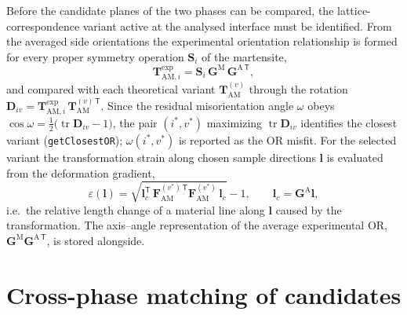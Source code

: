 \documentclass[11pt,a4paper]{article}
\newcommand{\mat}[1]{\mathbf{#1}}
\newcommand{\vc}[1]{\bm{#1}}
\newcommand{\trace}{\operatorname{tr}}
\begin{document}
Before the candidate planes of the two phases can be compared, the lattice-correspondence variant active at the analysed interface must be identified. From the averaged side orientations the experimental orientation relationship is formed for every proper symmetry operation $\mat S_i$ of the martensite,
\begin{equation}
\mat T^{\mathrm{exp}}_{\mathrm{AM},i}=\mat S_i\,\mat G^{\mathrm{M}}\,\mat G^{\mathrm{A}\,\mathsf T},
\label{eq:expOR}
\end{equation}
and compared with each theoretical variant $\mat T^{(v)}_{\mathrm{AM}}$ through the rotation $\mat D_{i v}=\mat T^{\mathrm{exp}}_{\mathrm{AM},i}\,\mat T^{(v)\,\mathsf T}_{\mathrm{AM}}$. Since the residual misorientation angle $\omega$ obeys $\cos\omega = \tfrac12\big(\trace \mat D_{iv}-1\big)$, the pair $(i^\ast,v^\ast)$ maximizing $\trace\mat D_{iv}$ identifies the closest variant (\texttt{getClosestOR}); $\omega(i^\ast,v^\ast)$ is reported as the OR misfit. For the selected variant the transformation strain along chosen sample directions $\vc l$ is evaluated from the deformation gradient,
\begin{equation}
\varepsilon(\vc l)=\sqrt{\vc l_{c}^{\mathsf T}\,\mat F^{(v^\ast)\,\mathsf T}_{\mathrm{AM}}\mat F^{(v^\ast)}_{\mathrm{AM}}\,\vc l_{c}}-1,
\qquad \vc l_c=\mat G^{\mathrm{A}}\vc l ,
\label{eq:strain}
\end{equation}
i.e.\ the relative length change of a material line along $\vc l$ caused by the transformation. The axis--angle representation of the average experimental OR, $\mat G^{\mathrm{M}}\mat G^{\mathrm{A}\,\mathsf T}$, is stored alongside.

\section{Cross-phase matching of candidates}
\end{document}
